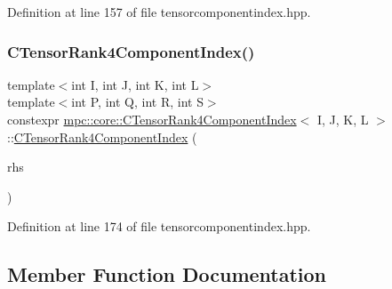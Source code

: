 Definition at line 157 of file tensorcomponentindex.\+hpp.

\mbox{\label{classmpc_1_1core_1_1_c_tensor_rank4_component_index_a04ed4e32ff536bfda855d15e87d3310c}} 
\subsubsection{\texorpdfstring{C\+Tensor\+Rank4\+Component\+Index()}{CTensorRank4ComponentIndex()}\hspace{0.1cm}{\footnotesize\ttfamily [2/2]}}
{\footnotesize\ttfamily template$<$int I, int J, int K, int L$>$ \\
template$<$int P, int Q, int R, int S$>$ \\
constexpr \mbox{\hyperlink{classmpc_1_1core_1_1_c_tensor_rank4_component_index}{mpc\+::core\+::\+C\+Tensor\+Rank4\+Component\+Index}}$<$ I, J, K, L $>$\+::\mbox{\hyperlink{classmpc_1_1core_1_1_c_tensor_rank4_component_index}{C\+Tensor\+Rank4\+Component\+Index}} (\begin{DoxyParamCaption}\item[{const \mbox{\hyperlink{classmpc_1_1core_1_1_c_tensor_rank4_component_index}{C\+Tensor\+Rank4\+Component\+Index}}$<$ P, Q, R, S $>$ \&}]{rhs }\end{DoxyParamCaption})\hspace{0.3cm}{\ttfamily [inline]}}



Definition at line 174 of file tensorcomponentindex.\+hpp.



\subsection{Member Function Documentation}
\mbox{\label{classmpc_1_1core_1_1_c_tensor_rank4_component_index_a85051cd05a5c3e0cb7d277118b2ec2c3}} 
